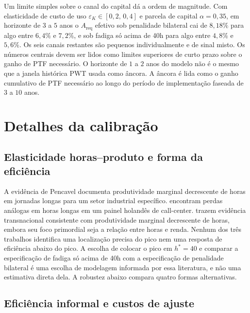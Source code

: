 \documentclass[12pt,a4paper]{article}
\begin{document}


Um limite simples sobre o canal do capital d\'a a ordem de magnitude. Com elasticidade de custo de uso $\varepsilon_K\in[0{,}2,\,0{,}4]$ \citep{Caballero1999} e parcela de capital $\alpha=0{,}35$, em horizonte de $3$ a $5$ anos o $A_{\text{req}}$ efetivo sob penalidade bilateral cai de $8{,}18\%$ para algo entre $6{,}4\%$ e $7{,}2\%$, e sob fadiga s\'o acima de 40h para algo entre $4{,}8\%$ e $5{,}6\%$. Os seis canais restantes s\~ao pequenos individualmente e de sinal misto. Os n\'umeros centrais devem ser lidos como limites superiores de curto prazo sobre o ganho de PTF necess\'ario. O horizonte de $1$ a $2$ anos do modelo n\~ao \'e o mesmo que a janela hist\'orica PWT usada como \^ancora. A \^ancora \'e lida como o ganho cumulativo de PTF necess\'ario ao longo do per\'iodo de implementa\c{c}\~ao faseada de $3$ a $10$ anos.

\clearpage
\section{Detalhes da calibra\c{c}\~ao}\label{app:calibration_details}

\subsection{Elasticidade horas--produto e forma da efici\^encia}

A evid\^encia de Pencavel documenta produtividade marginal decrescente de horas em jornadas longas para um setor industrial espec\'ifico. \citet{CollewetSauermann2017} encontram perdas an\'alogas em horas longas em um painel holand\^es de call-center. \citet{BickFuchsSchundelnLagakos2018} trazem evid\^encia transnacional consistente com produtividade marginal decrescente de horas, embora seu foco primordial seja a rela\c{c}\~ao entre horas e renda. Nenhum dos tr\^es trabalhos identifica uma localiza\c{c}\~ao precisa do pico nem uma resposta de efici\^encia abaixo do pico. A escolha de colocar o pico em $h^*=40$ e comparar a especifica\c{c}\~ao de fadiga s\'o acima de 40h com a especifica\c{c}\~ao de penalidade bilateral \'e uma escolha de modelagem informada por essa literatura, e n\~ao uma estimativa direta dela. A robustez abaixo compara quatro formas alternativas.

\subsection{Efici\^encia informal e custos de ajuste}
\end{document}
